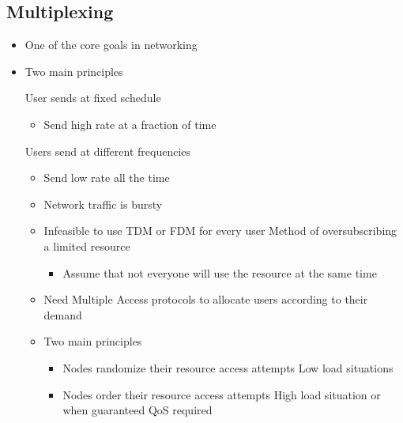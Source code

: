 \subsection{Multiplexing}
\begin{itemize}
     Share a limited resource
    \item One of the core goals in networking
    \item Two main principles
        \begin{itemize}
             User sends at fixed schedule
                \begin{itemize}
                    \item Send high rate at a fraction of time
                \end{itemize}
             Users send at different frequencies
                \begin{itemize}
                    \item Send low rate all the  time
                \end{itemize}
        \end{itemize}
        \begin{itemize}
            \item Network traffic is bursty
            \item Infeasible to use TDM or FDM for every user
             Method of oversubscribing a limited resource
                \begin{itemize}
                    \item Assume that not everyone will use the resource at the same time
                \end{itemize}
            \item Need Multiple Access protocols to allocate users according to their demand
            \item Two main principles
                \begin{itemize}
                        \begin{itemize}
                            \item Nodes randomize their resource access attempts
                            \ipro Low load situations
                        \end{itemize}
                        \begin{itemize}
                            \item Nodes order their resource access attempts
                            \ipro High load situation or when guaranteed QoS required
                        \end{itemize}
                \end{itemize}
        \end{itemize}
\end{itemize}

